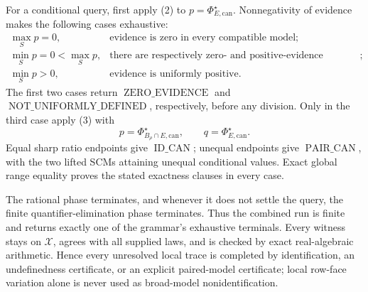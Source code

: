 For a conditional query, first apply (2) to
\(p=\Phi_{E,\mathrm{can}}^\star\). Nonnegativity of evidence makes the following cases exhaustive:
\[
\begin{array}{ll}
\max_S p=0,&\text{evidence is zero in every compatible model};\\
\min_S p=0<\max_S p,&\text{there are respectively zero- and positive-evidence witnesses};\\
\min_S p>0,&\text{evidence is uniformly positive}.
\end{array}\tag{4}
\]
The first two cases return \(\operatorname{ZERO\_EVIDENCE}\) and
\(\operatorname{NOT\_UNIFORMLY\_DEFINED}\), respectively, before any division. Only in the third case apply (3) with
\[
p=\Phi_{B_\rho\cap E,\mathrm{can}}^\star,\qquad
q=\Phi_{E,\mathrm{can}}^\star.\tag{5}
\]
Equal sharp ratio endpoints give \(\operatorname{ID\_CAN}\); unequal endpoints give \(\operatorname{PAIR\_CAN}\), with the two lifted SCMs attaining unequal conditional values. Exact global range equality proves the stated exactness clauses in every case.

The rational phase terminates, and whenever it does not settle the query, the finite quantifier-elimination phase terminates. Thus the combined run is finite and returns exactly one of the grammar's exhaustive terminals. Every witness stays on \(\mathcal X\), agrees with all supplied laws, and is checked by exact real-algebraic arithmetic. Hence every unresolved local trace is completed by identification, an undefinedness certificate, or an explicit paired-model certificate; local row-face variation alone is never used as broad-model nonidentification.
